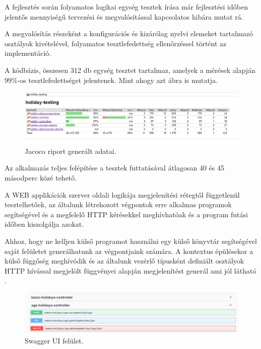 

A fejlesztés során folyamatos logikai egység tesztek írása már fejlesztési időben jelentős mennyiségű tervezési és megvalósítással kapcsolatos hibára mutat rá.

A megvalósítás részeként a konfigurációs és kizárólag nyelvi elemeket tartalmazó osztályok kivételével, folyamatos tesztlefedettség ellenőrzéssel történt az implementáció.

\vskip 0.2in
A kódbázis, összesen 312 db egység tesztet tartalmaz, amelyek a mérések alapján 99\%-os tesztlefedettséget jelentenek.
Mint ahogy azt  ábra is mutatja.

\begin{figure}[h]
\centering
\includegraphics[scale=0.5]{images/jacocoReport.png}
\caption{Jacoco riport generált adatai.}
\label{fig:jacocoReport}
\end{figure}

Az alkalmazás teljes felépítése a tesztek futtatásával átlagosan 40 és 45 másodperc közé tehető.


A WEB applikációk szerver oldali logikája megjelenítési rétegtől függetlenül tesztelhetőek, az általunk létrehozott végpontok erre alkalmas programok segítségével és a megfelelő HTTP kérésekkel meghívhatóak és a program futási időben kiszolgálja azokat.
\vskip 0.2in

Ahhoz, hogy ne kelljen külső programot használni egy külső könyvtár segítségével saját felületet generálhatunk az végpontjaink számára. A kontextus épülésekor a külső függőség meghívódik és az általunk vezérlő típusként definiált osztályok HTTP hívással megjelölt függvényei alapján megjelenítést generál ami jól látható . 

\begin{figure}[h]
	\centering
	\includegraphics[scale=0.3]{images/swaggerUI.png}
	\caption{Swagger UI felület.}
	\label{fig:swaggerUI}
\end{figure}

